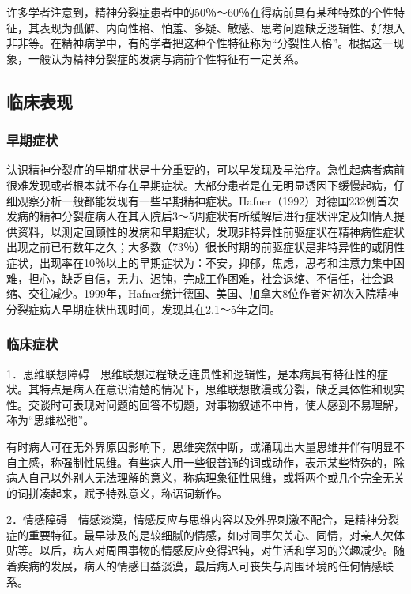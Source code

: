 许多学者注意到，精神分裂症患者中的50％～60％在得病前具有某种特殊的个性特征，其表现为孤僻、内向性格、怕羞、多疑、敏感、思考问题缺乏逻辑性、好想入非非等。在精神病学中，有的学者把这种个性特征称为``分裂性人格''。根据这一现象，一般认为精神分裂症的发病与病前个性特征有一定关系。

\subsection{临床表现}

\subsubsection{早期症状}

认识精神分裂症的早期症状是十分重要的，可以早发现及早治疗。急性起病者病前很难发现或者根本就不存在早期症状。大部分患者是在无明显诱因下缓慢起病，仔细观察分析一般都能发现有一些早期精神症状。Hafner（1992）对德国232例首次发病的精神分裂症病人在其入院后3～5周症状有所缓解后进行症状评定及知情人提供资料，以测定回顾性的发病和早期症状，发现非特异性前驱症状在精神病性症状出现之前已有数年之久；大多数（73％）很长时期的前驱症状是非特异性的或阴性症状，出现率在10％以上的早期症状为：不安，抑郁，焦虑，思考和注意力集中困难，担心，缺乏自信，无力、迟钝，完成工作困难，社会退缩、不信任，社会退缩、交往减少。1999年，Hafner统计德国、美国、加拿大8位作者对初次入院精神分裂症病人早期症状出现时间，发现其在2.1～5年之间。

\subsubsection{临床症状}

1．思维联想障碍　思维联想过程缺乏连贯性和逻辑性，是本病具有特征性的症状。其特点是病人在意识清楚的情况下，思维联想散漫或分裂，缺乏具体性和现实性。交谈时可表现对问题的回答不切题，对事物叙述不中肯，使人感到不易理解，称为``思维松弛''。

有时病人可在无外界原因影响下，思维突然中断，或涌现出大量思维并伴有明显不自主感，称强制性思维。有些病人用一些很普通的词或动作，表示某些特殊的，除病人自己以外别人无法理解的意义，称病理象征性思维，或将两个或几个完全无关的词拼凑起来，赋予特殊意义，称语词新作。

2．情感障碍　情感淡漠，情感反应与思维内容以及外界刺激不配合，是精神分裂症的重要特征。最早涉及的是较细腻的情感，如对同事欠关心、同情，对亲人欠体贴等。以后，病人对周围事物的情感反应变得迟钝，对生活和学习的兴趣减少。随着疾病的发展，病人的情感日益淡漠，最后病人可丧失与周围环境的任何情感联系。

